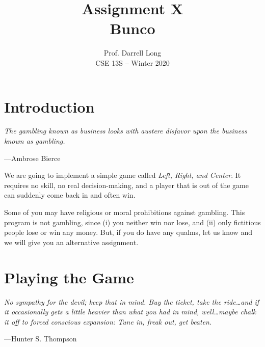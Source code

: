 \documentclass{article}
\title{Assignment X \\ Bunco}
\author{Prof. Darrell Long \\
CSE 13S -- Winter 2020}
\begin{document}
\maketitle


\section{Introduction}
\textwidth
\epigraph{\emph{The gambling known as business looks with austere disfavor
upon the business known as gambling.}}{---Ambrose Bierce}

\noindent We are going to implement a simple game called \emph{Left, Right, and Center}.
It requires no skill, no real decision-making, and a player that is out of the
game can suddenly come back in and often win.

Some of you may have religious or moral prohibitions against gambling. This
program is not gambling, since (i) you neither win nor lose, and (ii) only
fictitious people lose or win any money. But, if you do have any qualms, let
us know and we will give you an alternative assignment.

\section{Playing the Game}
\textwidth
\epigraph{\emph{No sympathy for the devil; keep that in mind. Buy
the ticket, take the ride\ldots and if it occasionally gets a little
heavier than what you had in mind, well\ldots maybe chalk it off
to forced conscious expansion: Tune in, freak out, get beaten.}}{---Hunter
S. Thompson}
\end{document}
